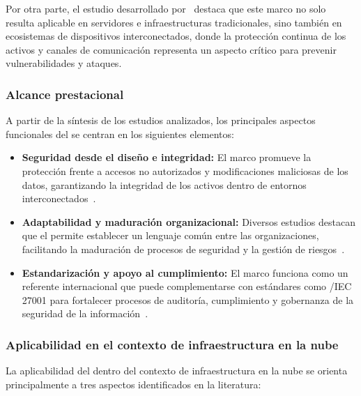 Por otra parte, el estudio desarrollado por~\cite{ulloa2025integral} destaca que este marco no solo resulta aplicable en servidores e 
infraestructuras tradicionales, sino también en ecosistemas de dispositivos interconectados, donde la protección continua de los activos y 
canales de comunicación representa un aspecto crítico para prevenir vulnerabilidades y ataques.

\subsubsection{Alcance prestacional}

A partir de la síntesis de los estudios analizados, los principales aspectos funcionales del \NISTCSF se centran en los siguientes 
elementos:

\begin{itemize}
	\item \textbf{Seguridad desde el diseño e integridad:} El marco promueve la protección frente a accesos no autorizados y modificaciones maliciosas de los datos, garantizando la integridad de los activos dentro de entornos interconectados~\cite{ulloa2025integral}.
	
	\item \textbf{Adaptabilidad y maduración organizacional:} Diversos estudios destacan que el \NISTCSF permite establecer un lenguaje común entre las organizaciones, facilitando la maduración de procesos de seguridad y la gestión de riesgos~\cite{tissir2021cybersecurity,rajesh2024unified}.
	
	\item \textbf{Estandarización y apoyo al cumplimiento:} El marco funciona como un referente internacional que puede complementarse con estándares como \ISO/IEC 27001 para fortalecer procesos de auditoría, cumplimiento y gobernanza de la seguridad de la información~\cite{gambo2025navigating}.
\end{itemize}

\subsubsection{Aplicabilidad en el contexto de infraestructura en la nube}

La aplicabilidad del \NISTCSF dentro del contexto de infraestructura en la nube se orienta principalmente a tres aspectos identificados en 
la literatura:

